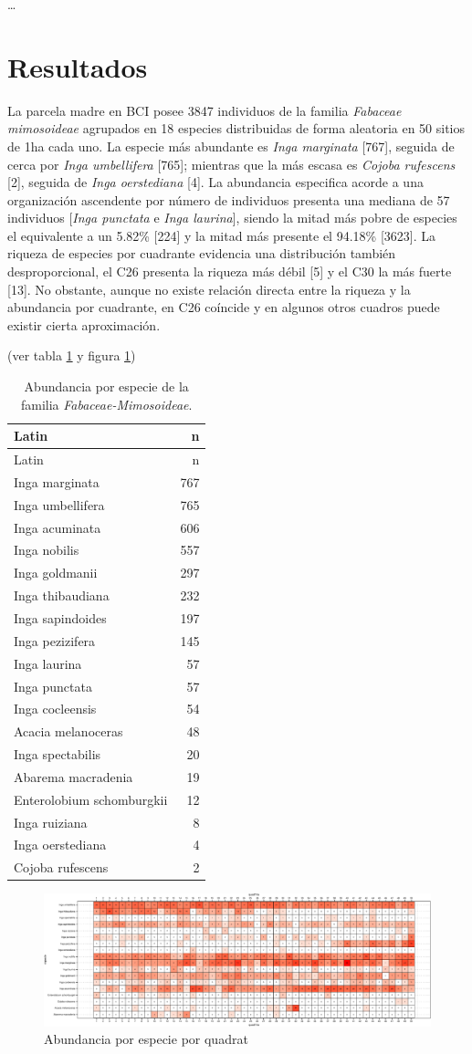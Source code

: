 \documentclass[11pt,]{article}
\begin{document}
\ldots

\section{Resultados}\label{resultados}

La parcela madre en BCI posee 3847 individuos de la familia
\emph{Fabaceae mimosoideae} agrupados en 18 especies distribuidas de
forma aleatoria en 50 sitios de 1ha cada uno. La especie más abundante
es \emph{Inga marginata} {[}767{]}, seguida de cerca por \emph{Inga
umbellifera} {[}765{]}; mientras que la más escasa es \emph{Cojoba
rufescens} {[}2{]}, seguida de \emph{Inga oerstediana} {[}4{]}. La
abundancia especifica acorde a una organización ascendente por número de
individuos presenta una mediana de 57 individuos {[}\emph{Inga punctata}
e \emph{Inga laurina}{]}, siendo la mitad más pobre de especies el
equivalente a un 5.82\% {[}224{]} y la mitad más presente el 94.18\%
{[}3623{]}. La riqueza de especies por cuadrante evidencia una
distribución también desproporcional, el C26 presenta la riqueza más
débil {[}5{]} y el C30 la más fuerte {[}13{]}. No obstante, aunque no
existe relación directa entre la riqueza y la abundancia por cuadrante,
en C26 coíncide y en algunos otros cuadros puede existir cierta
aproximación.

(ver tabla \ref{tab:abun_sp} y figura \ref{fig:abun_sp_q})

\begin{longtable}[]{@{}lr@{}}
\caption{\label{tab:abun_sp}Abundancia por especie de la familia
\emph{Fabaceae-Mimosoideae}.}\tabularnewline
\toprule
Latin & n\tabularnewline
\midrule
\endfirsthead
\toprule
Latin & n\tabularnewline
\midrule
\endhead
Inga marginata & 767\tabularnewline
Inga umbellifera & 765\tabularnewline
Inga acuminata & 606\tabularnewline
Inga nobilis & 557\tabularnewline
Inga goldmanii & 297\tabularnewline
Inga thibaudiana & 232\tabularnewline
Inga sapindoides & 197\tabularnewline
Inga pezizifera & 145\tabularnewline
Inga laurina & 57\tabularnewline
Inga punctata & 57\tabularnewline
Inga cocleensis & 54\tabularnewline
Acacia melanoceras & 48\tabularnewline
Inga spectabilis & 20\tabularnewline
Abarema macradenia & 19\tabularnewline
Enterolobium schomburgkii & 12\tabularnewline
Inga ruiziana & 8\tabularnewline
Inga oerstediana & 4\tabularnewline
Cojoba rufescens & 2\tabularnewline
\bottomrule
\end{longtable}

\begin{figure}
\centering
\includegraphics{manuscrito_files/figure-latex/unnamed-chunk-3-1.pdf}
\caption{\label{fig:abun_sp_q}Abundancia por especie por quadrat}
\end{figure}
\end{document}
